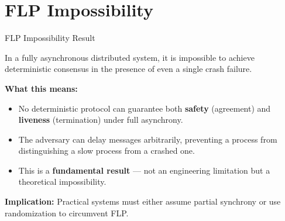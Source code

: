\section{FLP Impossibility}

\begin{frame}{FLP Impossibility Result}
\begin{tcolorbox}[thmblock,title={Theorem (Fischer--Lynch--Paterson, 1985)}]
In a fully asynchronous distributed system, it is impossible to achieve deterministic consensus in the presence of even a single crash failure.
\end{tcolorbox}

\pause

\vspace{10pt}
\textbf{What this means:}
\begin{itemize}
  \item<2-> No deterministic protocol can guarantee both \textbf{safety} (agreement) and \textbf{liveness} (termination) under full asynchrony.
  \item<3-> The adversary can delay messages arbitrarily, preventing a process from distinguishing a slow process from a crashed one.
  \item<4-> This is a \textbf{fundamental result} --- not an engineering limitation but a theoretical impossibility.
\end{itemize}

\pause

\vspace{10pt}
\textbf{Implication:} Practical systems must either assume partial synchrony or use randomization to circumvent FLP.
\end{frame}
